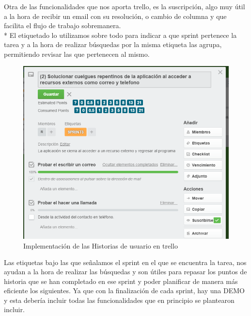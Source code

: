 \documentclass[../pfc.tex]{subfiles}
\begin{document}
	\clearpage
	
	Otra de las funcionalidades que nos aporta trello, es la suscripción, algo muy útil a la hora de recibir un email con su resolución, o cambio de columna y que facilita el flujo de trabajo sobremanera.\\*
	El etiquetado lo utilizamos sobre todo para indicar a que sprint pertenece la tarea y a la hora de realizar búsquedas por la misma etiqueta las agrupa, permitiendo revisar las que pertenecen al mismo.
	
		\begin{figure}[H]
			\centering
			\includegraphics[width=1\linewidth]{../images/tarea2}
			\caption{Implementación de las Historias de usuario en trello}
			\label{fig:tareaTrello}
		\end{figure}
		
	Las etiquetas bajo las que señalamos el sprint en el que se encuentra la tarea, nos ayudan a la hora de realizar las búsquedas y son útiles para repasar los puntos de historia que se han completado en ese sprint y poder planificar de manera más eficiente los siguientes. Ya que con la finalización de cada sprint, hay una DEMO y esta debería incluir todas las funcionalidades que en principio se plantearon incluir.
		
\end{document}
